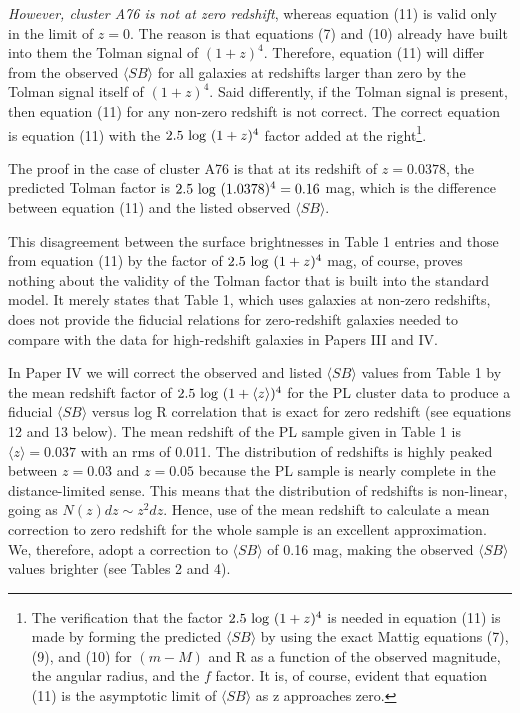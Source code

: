 \documentclass[preprint]{aastex}
\begin{document}
{\it However, cluster A76 is not at zero redshift}, whereas equation
(11) is valid only in the limit of $z = 0$. The reason is that
equations (7) and (10) already have built into them the Tolman signal
of $(1 + z)^4$. Therefore, equation (11) will differ from the observed
$\langle SB \rangle$ for all galaxies at redshifts larger than zero by
the Tolman signal itself of $(1 + z)^4$. Said differently, if the
Tolman signal is present, then equation (11) for any non-zero redshift
is not correct. The correct equation is equation (11) with the
$2.5~{\rm log}~(1 + z)^4$ factor added at the right\footnote{The
verification that the factor $2.5~{\rm log}~(1 + z)^4$ is needed in
equation (11) is made by forming the predicted $\langle SB \rangle$ by
using the exact Mattig equations (7), (9), and (10) for $(m - M)$ and
R as a function of the observed magnitude, the angular radius, and the
$f$ factor. It is, of course, evident that equation (11) is the
asymptotic limit of $\langle SB \rangle$ as z approaches zero.}.

The proof in the case of cluster A76 is that at its redshift of $z =
0.0378$, the predicted Tolman factor is $2.5~{\rm log}~(1.0378)^4 =
0.16$ mag, which is the difference between equation (11) and the
listed observed $\langle SB \rangle$.

This disagreement between the surface brightnesses in Table 1 entries
and those from equation (11) by the factor of $2.5~{\rm log}~(1 +
z)^4$ mag, of course, proves nothing about the validity of the Tolman
factor that is built into the standard model. It merely states that
Table 1, which uses galaxies at non-zero redshifts, does not provide
the fiducial relations for zero-redshift galaxies needed to compare
with the data for high-redshift galaxies in Papers III and IV.

In Paper IV we will correct the observed and listed $\langle SB
\rangle$ values from Table 1 by the mean redshift factor of $2.5~{\rm
log}~(1 + \langle z \rangle)^4$ for the PL cluster data to produce a
fiducial $\langle SB \rangle$ versus log R correlation that is exact
for zero redshift (see equations 12 and 13 below). The mean redshift
of the PL sample given in Table 1 is $\langle z \rangle = 0.037$ with
an rms of 0.011. The distribution of redshifts is highly peaked
between $z = 0.03$ and $z = 0.05$ because the PL sample is nearly
complete in the distance-limited sense.  This means that the
distribution of redshifts is non-linear, going as $N(z)dz \sim
z^{2}dz$. Hence, use of the mean redshift to calculate a mean
correction to zero redshift for the whole sample is an excellent
approximation. We, therefore, adopt a correction to $\langle SB
\rangle$ of 0.16 mag, making the observed $\langle SB \rangle$ values
brighter (see Tables 2 and 4).
\end{document}

